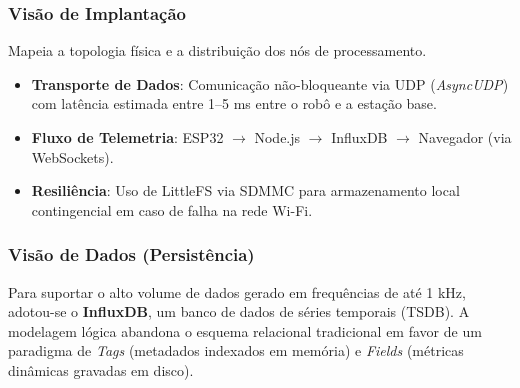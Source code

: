 \subsubsection{Visão de Implantação}
Mapeia a topologia física e a distribuição dos nós de processamento.

\begin{itemize}
    \item \textbf{Transporte de Dados}: Comunicação não-bloqueante via UDP (\textit{AsyncUDP}) com latência estimada entre 1--5 ms entre o robô e a estação base.
    \item \textbf{Fluxo de Telemetria}: ESP32 $\rightarrow$ Node.js $\rightarrow$ InfluxDB $\rightarrow$ Navegador (via WebSockets).
    \item \textbf{Resiliência}: Uso de LittleFS via SDMMC para armazenamento local contingencial em caso de falha na rede Wi-Fi.
\end{itemize}

\subsubsection{Visão de Dados (Persistência)}

Para suportar o alto volume de dados gerado em frequências de até 1 kHz, adotou-se o \textbf{InfluxDB}, um banco de dados de séries temporais (TSDB). A modelagem lógica abandona o esquema relacional tradicional em favor de um paradigma de \textit{Tags} (metadados indexados em memória) e \textit{Fields} (métricas dinâmicas gravadas em disco).

